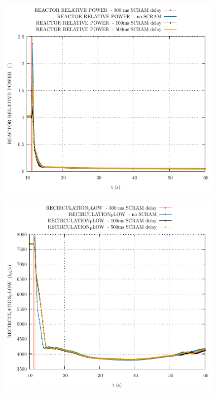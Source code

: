 \documentclass{article}
\begin{document}
\begin{multicols}{2}
\begin{figure}[H]
\end{figure}
\begin{figure}[H]
\centering
\includegraphics[width=\columnwidth]{./graphs/REACTOR RELATIVE POWER _comp.pdf}
\end{figure}
\begin{figure}[H]
\centering
\includegraphics[width=\columnwidth]{./graphs/RECIRCULATION_FLOW _comp.pdf}

\end{figure}
\end{multicols}
\end{document}
